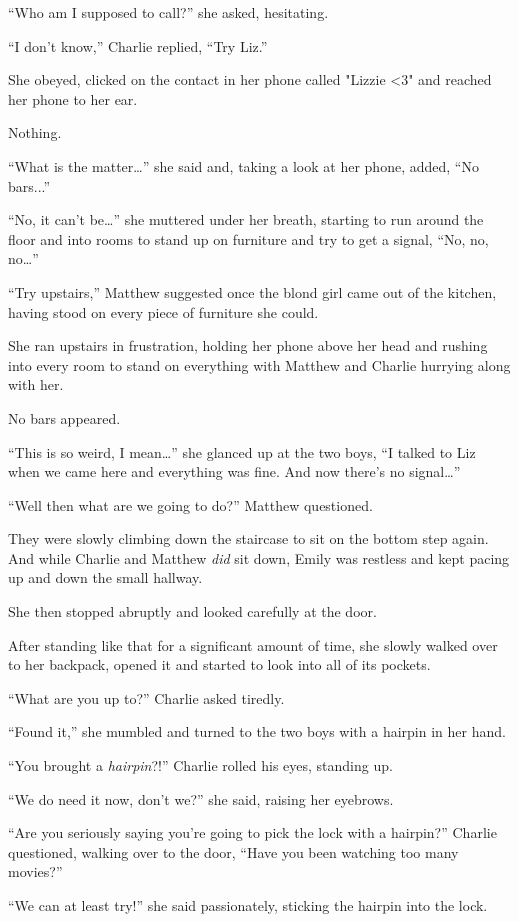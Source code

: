 “Who am I supposed to call?” she asked, hesitating.

“I don't know,” Charlie replied, “Try Liz.”

She obeyed, clicked on the contact in her phone called "Lizzie <3" and reached her phone to her ear.

Nothing.

“What is the matter…” she said and, taking a look at her phone, added, “No bars...”

“No, it can't be…” she muttered under her breath, starting to run around the floor and into rooms to stand up on furniture and try to get a signal, “No, no, no…”

“Try upstairs,” Matthew suggested once the blond girl came out of the kitchen, having stood on every piece of furniture she could.

She ran upstairs in frustration, holding her phone above her head and rushing into every room to stand on everything with Matthew and Charlie hurrying along with her.

No bars appeared.

“This is so weird, I mean…” she glanced up at the two boys, “I talked to Liz when we came here and everything was fine. And now there's no signal…”

“Well then what are we going to do?” Matthew questioned.

They were slowly climbing down the staircase to sit on the bottom step again. And while Charlie and Matthew \textit{did} sit down, Emily was restless and kept pacing up and down the small hallway.

She then stopped abruptly and looked carefully at the door.

After standing like that for a significant amount of time, she slowly walked over to her backpack, opened it and started to look into all of its pockets.

“What are you up to?” Charlie asked tiredly.

“Found it,” she mumbled and turned to the two boys with a hairpin in her hand.

“You brought a \textit{hairpin}?!” Charlie rolled his eyes, standing up.

“We do need it now, don't we?” she said, raising her eyebrows.

“Are you seriously saying you're going to pick the lock with a hairpin?” Charlie questioned, walking over to the door, “Have you been watching too many movies?”

“We can at least try!” she said passionately, sticking the hairpin into the lock.

